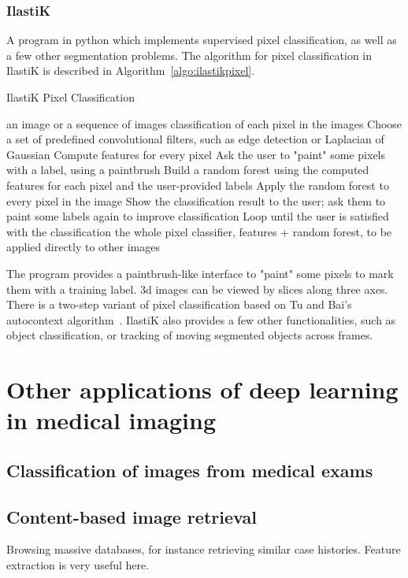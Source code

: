 \documentclass[11pt]{article} %
\begin{document}
    \subsubsection{IlastiK~\cite{berg:ilastik}}
      A program in python which implements supervised pixel classification, as well as a few other segmentation problems. The algorithm for pixel classification in IlastiK is described in Algorithm~\ref{algo:ilastikpixel}.
      \begin{algorithm}
      \caption{IlastiK Pixel Classification~\cite{berg:ilastik}}
      \label{algo:ilastikpixel}
      \begin{algorithmic}
        \REQUIRE an image or a sequence of images
        \ENSURE classification of each pixel in the images
        \STATE Choose a set of predefined convolutional filters, such as edge detection or Laplacian of Gaussian
        \STATE Compute features for every pixel
        \STATE Ask the user to "paint" some pixels with a label, using a paintbrush
        \STATE Build a random forest using the computed features for each pixel and the user-provided labels
        \STATE Apply the random forest to every pixel in the image
        \STATE Show the classification result to the user; ask them to paint some labels again to improve classification
        \STATE Loop until the user is satisfied with the classification
        \RETURN the whole pixel classifier, features + random forest, to be applied directly to other images
      \end{algorithmic}
      \end{algorithm}
      The program provides a paintbrush-like interface to "paint" some pixels to mark them with a training label. 3d images can be viewed by slices along three axes. There is a two-step variant of pixel classification based on Tu and Bai's autocontext algorithm~\cite{tubai:autocontext}. IlastiK also provides a few other functionalities, such as object classification, or tracking of moving segmented objects across frames.


\section{Other applications of deep learning in medical imaging \cite{litjens:deeplearning}}
  \subsection{Classification of images from medical exams}
  \subsection{Content-based image retrieval}
    Browsing massive databases, for instance retrieving similar case histories. Feature extraction is very useful here.
\end{document}
